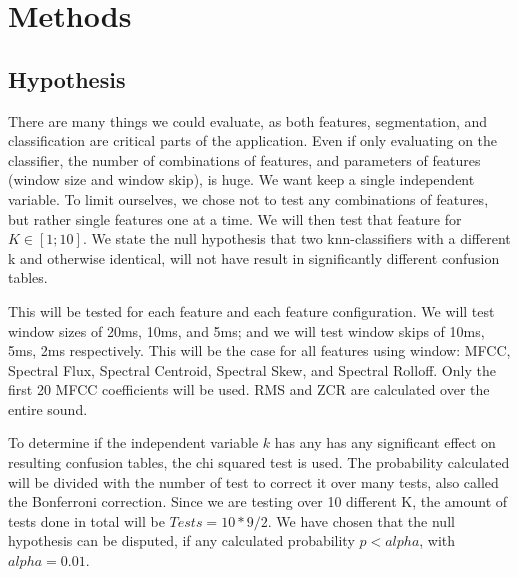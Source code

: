 
\section{Methods}
	\subsection{Hypothesis}
		There are many things we could evaluate, as both features, segmentation, and classification are critical parts of the application. Even if only evaluating on the classifier, the number of combinations of features, and parameters of features (window size and window skip), is huge. We want keep a single independent variable. To limit ourselves, we chose not to test any combinations of features, but rather single features one at a time. We will then test that feature for $K \in [1;10]$. We state the null hypothesis that two knn-classifiers with a different k and otherwise identical, will not have result in significantly different confusion tables.
		
		This will be tested for each feature and each feature configuration.
		We will test window sizes of 20ms, 10ms, and 5ms; and we will test window skips of 10ms, 5ms, 2ms respectively. This will be the case for all features using window: MFCC, Spectral Flux, Spectral Centroid, Spectral Skew, and Spectral Rolloff. Only the first 20 MFCC coefficients will be used. RMS and ZCR are calculated over the entire sound.
		
		To determine if the independent variable $k$ has any has any significant effect on resulting confusion tables, the chi squared test is used. The probability calculated will be divided with the number of test to correct it over many tests, also called the Bonferroni correction\citep{bonferroni}.
		Since we are testing over 10 different K, the amount of tests done in total will be $Tests = 10*9/2$.
		We have chosen that the null hypothesis can be disputed, if any calculated probability $p < alpha$, with $alpha=0.01$.
		
